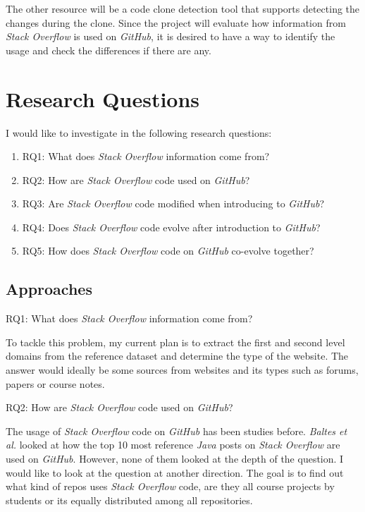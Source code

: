 \documentclass[sigconf]{acmart}
\begin{document}
The other resource will be a code clone detection tool that supports detecting the changes during the clone. Since the project will evaluate how information from {\it Stack Overflow} is used on {\it GitHub}, it is desired to have a way to identify the usage and check the differences if there are any. 


\section{Research Questions}

I would like to investigate in the following research questions:

\begin{enumerate}
	\item RQ1: What does {\it Stack Overflow} information come from?
	\item RQ2: How are {\it Stack Overflow} code used on {\it GitHub}?
	\item RQ3: Are {\it Stack Overflow} code modified when introducing to {\it GitHub}?
	\item RQ4: Does {\it Stack Overflow} code evolve after introduction to {\it GitHub}?
	\item RQ5: How does {\it Stack Overflow} code on {\it GitHub} co-evolve together?
\end{enumerate}

\subsection{Approaches}

RQ1: What does {\it Stack Overflow} information come from?

To tackle this problem, my current plan is to extract the first and second level domains from the reference dataset and determine the type of the website. The answer would ideally be some sources from websites and its types such as forums, papers or course notes.

RQ2: How are {\it Stack Overflow} code used on {\it GitHub}?

The usage of {\it Stack Overflow} code on {\it GitHub} has been studies before. {\it Baltes et al.} looked at how the top 10 most reference {\it Java} posts on {\it Stack Overflow} are used on {\it GitHub}. \cite{Baltes2018}  However, none of them looked at the depth of the question. I would like to look at the question at another direction. The goal is to find out what kind of repos uses {\it Stack Overflow} code, are they all course projects by students or its equally distributed among all repositories. 
\end{document}
